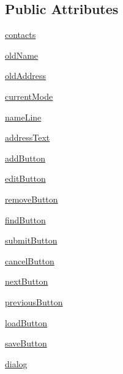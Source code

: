 \subsection*{Public Attributes}
\begin{DoxyCompactItemize}
\item 
\hyperlink{classpart6_1_1AddressBook_ae9e153a64cca7dc2c051f79dd59111bb}{contacts}
\item 
\hyperlink{classpart6_1_1AddressBook_a375d305a35c478ab94cc95afcbbfc941}{old\+Name}
\item 
\hyperlink{classpart6_1_1AddressBook_af53507e3a0b596c9b118a0c13784a505}{old\+Address}
\item 
\hyperlink{classpart6_1_1AddressBook_afb196fe75345f056c406e24241eb05f4}{current\+Mode}
\item 
\hyperlink{classpart6_1_1AddressBook_a6df6560221c40d30d05c8c315f39140b}{name\+Line}
\item 
\hyperlink{classpart6_1_1AddressBook_a74cf4140a2b38a4eed170f4475fe5b88}{address\+Text}
\item 
\hyperlink{classpart6_1_1AddressBook_a8253bfad4a0f972ce7a942ec8ae4503b}{add\+Button}
\item 
\hyperlink{classpart6_1_1AddressBook_a6da200ce84c8fb3c4a16d9bb2f082f96}{edit\+Button}
\item 
\hyperlink{classpart6_1_1AddressBook_a1d4cfe2106796afd0eca44947cb92ad1}{remove\+Button}
\item 
\hyperlink{classpart6_1_1AddressBook_aba6b4a28171881e546f0f7a7e433b415}{find\+Button}
\item 
\hyperlink{classpart6_1_1AddressBook_a7a21f06d4613f0833e5bfc904f984392}{submit\+Button}
\item 
\hyperlink{classpart6_1_1AddressBook_a9e91cd55c1e98792da8db5c563bc6d3b}{cancel\+Button}
\item 
\hyperlink{classpart6_1_1AddressBook_a23dc84d53648e3196eadb3cd68709b3c}{next\+Button}
\item 
\hyperlink{classpart6_1_1AddressBook_a4984b1305b40ce42ab423723cf549ed9}{previous\+Button}
\item 
\hyperlink{classpart6_1_1AddressBook_a9b38c3e95e5a90d6f8c6209f0c70be5c}{load\+Button}
\item 
\hyperlink{classpart6_1_1AddressBook_ae52e3150726e653dd684992f13e5d632}{save\+Button}
\item 
\hyperlink{classpart6_1_1AddressBook_ac5885a47b3c45b82045c608b5c0765c5}{dialog}
\end{DoxyCompactItemize}


